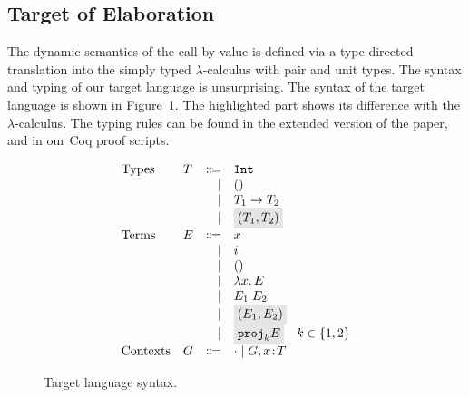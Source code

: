 
\subsection{Target of Elaboration}
The dynamic semantics of the call-by-value \name is defined via a
type-directed translation into the simply typed $\lambda$-calculus
with pair and unit types. 
The syntax and typing of our target language is unsurprising. The syntax of the
target language is shown in Figure~\ref{fig:f-syntax}. The highlighted part
shows its difference with the $\lambda$-calculus. 
The typing rules can 
be found in the extended version of the paper, and in our Coq proof
scripts.

\begin{figure}[t]
  \[
    \begin{array}{llrl}
      \text{Types}    & T & \Coloneqq & \code{Int} \\
                      &   & \mid      & \unit \\
                      &   & \mid      & {T_1} \to {T_2} \\
                      &   & \mid      & \highlight {$ \pair {T_1} {T_2} $} \\
      \text{Terms}    & E & \Coloneqq & x \\
                      &   & \mid      & i \\
                      &   & \mid      & \unit \\
                      &   & \mid      & \lamty x T E \\
                      &   & \mid      & \app {E_1} {E_2} \\
                      &   & \mid      & \highlight {$ \pair {E_1} {E_2} $} \\
                      &   & \mid      & \highlight {$ \proj k E $} \quad k \in \{ 1, 2 \} \\
      \text{Contexts} & G & \Coloneqq & \cdot \mid G, x \oftype T \\
    \end{array}
  \]
  \caption{Target language syntax.}
  \label{fig:f-syntax}
\end{figure}


